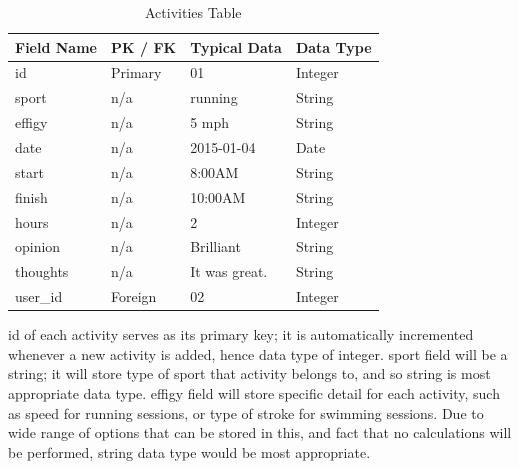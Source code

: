 \documentclass{article}[12pt,a4paper]
\begin{document}
\begin{table}[h]
\begin{tabular}{|l|l|l|l|}
\hline
\textbf{Field Name} & \textbf{PK / FK} & \textbf{Typical Data} & \textbf{Data Type} \\ \hline
id                  & Primary          & 01                    & Integer            \\ \hline
sport               & n/a              & running               & String             \\ \hline
effigy              & n/a              & 5 mph                 & String             \\ \hline
date                & n/a              & 2015-01-04            & Date               \\ \hline
start               & n/a              & 8:00AM                & String             \\ \hline
finish              & n/a              & 10:00AM               & String             \\ \hline
hours               & n/a              & 2                     & Integer            \\ \hline
opinion             & n/a              & Brilliant             & String             \\ \hline
thoughts            & n/a              & It was great.         & String             \\ \hline
user\_id            & Foreign          & 02                    & Integer            \\ \hline
\end{tabular}
\caption{Activities Table}
\end{table}

id of each activity serves as its primary key; it is automatically incremented whenever a new activity is added, hence data type of integer. sport field will be a string; it will store type of sport that activity belongs to, and so string is most appropriate data type. effigy field will store specific detail for each activity, such as speed for running sessions, or type of stroke for swimming sessions. Due to wide range of options that can be stored in this, and fact that no calculations will be performed, string data type would be most appropriate. 
\end{document}

